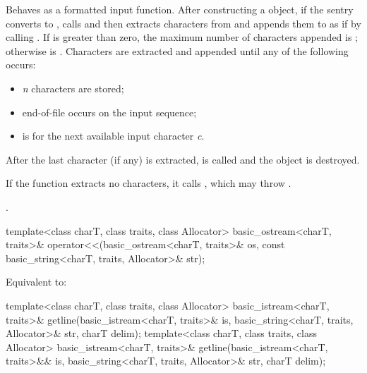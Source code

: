 \begin{itemdescr}
\pnum
\effects
Behaves as a formatted input function.
After constructing a
object, if the sentry converts to , calls
and then extracts characters from  and appends them
to  as if by calling
.
If
is greater than zero, the maximum
number  of characters appended is
;
otherwise  is
.
Characters are extracted and appended until any of the following
occurs:

\begin{itemize}
\item
\textit{n}
characters are stored;
\item
end-of-file occurs on the input sequence;
\item
{}
is  for the next available input character
\textit{c}.
\end{itemize}

\pnum
After the last character (if any) is extracted,
is called and the
object is destroyed.

\pnum
If the function extracts no characters, it calls
,
which may throw
.

\pnum
\returns
{}.
\end{itemdescr}

%
\begin{itemdecl}
template<class charT, class traits, class Allocator>
  basic_ostream<charT, traits>&
    operator<<(basic_ostream<charT, traits>& os,
               const basic_string<charT, traits, Allocator>& str);
\end{itemdecl}

\begin{itemdescr}
\pnum
\effects
Equivalent to: 
\end{itemdescr}

%
\begin{itemdecl}
template<class charT, class traits, class Allocator>
  basic_istream<charT, traits>&
    getline(basic_istream<charT, traits>& is,
            basic_string<charT, traits, Allocator>& str,
            charT delim);
template<class charT, class traits, class Allocator>
  basic_istream<charT, traits>&
    getline(basic_istream<charT, traits>&& is,
            basic_string<charT, traits, Allocator>& str,
            charT delim);
\end{itemdecl}

